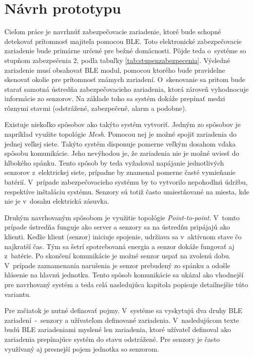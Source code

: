 \chapter{Návrh prototypu}

Cieľom práce je navrhnúť zabezpečovacie zariadenie, ktoré bude schopné detekovať prítomnosť majiteľa pomocou BLE. Toto elektronické zabezpečovacie zariadenie bude primárne určené pre bežné domácnosti. Pôjde teda o~systéme so stupňom zabezpečenia 2, podľa tabuľky \ref{tab:stupenzabezpecenia}. Výsledné zariadenie musí obsahovať BLE modul, pomocou ktorého bude pravidelne skenovať okolie pre prítomnosť známych zariadení. O~skenovanie sa pritom bude starať samotná ústredňa zabezpečovacieho zariadenia, ktorá zároveň vyhodnocuje informácie zo senzorov. Na základe toho sa systém dokáže prepínať medzi rôznymi stavmi (odstrážené, zabezpečené, alarm a podobne).

Existuje niekoľko spôsobov ako takýto systém vytvoriť. Jedným zo spôsobov je napríklad využite topológie \textit{Mesh}. Pomocou nej je možné spojiť zariadenia do jednej veľkej siete. Takýto systém disponuje pomerne veľkým dosahom vďaka spôsobu komunikácie. Jeho nevýhodou je, že zariadenia nie je možné uviesť do hlbokého spánku. Tento spôsob by teda vyžadoval napájanie jednotlivých senzorov z~elektrickej siete, prípadne by znamenal pomerne časté vymieňanie batérií. V~prípade zabezpečovacieho systému by to vytvorilo nepohodlnú údržbu, respektíve inštaláciu systému. Senzory sú totiž často umiestňované na miesta, kde nie je v~dosahu elektrická zásuvka.

Druhým navrhovaným spôsobom je využitie topológie \textit{Point-to-point}. V~tomto prípade ústredňa funguje ako server a senzory sa na ústredňu pripájajú ako klienti. Keďže klient (senzor) iniciuje spojenie, udržiava sa v~aktívnom stave čo najkratší čas. Tým sa šetrí spotrebovaná energia a senzor dokáže fungovať aj z~batérie. Po skončení komunikácie je možné senzor uspať na zvolenú dobu. V~prípade zaznamenania narušenia je senzor prebudený zo spánku a odošle hlásenie na hlavnú jednotku. Tento spôsob komunikácie sa ukázal ako vhodnejší pre navrhovaný systém a teda celá nasledujúca kapitola popisuje detailnejšie túto variantu.

Pre začiatok je nutné definovať pojmy. V~systéme sa vyskytujú dva druhy BLE zariadení~-~senzory a užívateľom definované zariadenia. V~nasledujúcom texte budú BLE zariadeniami myslené len zariadenia, ktoré užívateľ definoval ako zariadenia prepínajúce systém do stavu odstrážené. Pre senzory je často využívaný aj presnejší pojem jednotka so senzorom.

